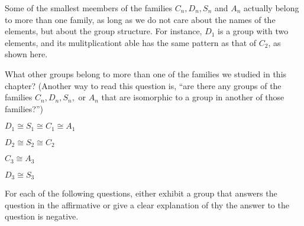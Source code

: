\begin{questions}

	\question Some of the smallest meembers of the families $C_n,D_n, S_n$ and $A_n$ actually belong to more than one family, as long as we do not care about the names of the elements, but about the group structure. For instance, $D_1$ is a group with two elements, and its mulitplicationt able has the same pattern as that of $C_2$, as shown here.
	\par What other groups belong to more than one of the families we studied in this chapter? (Another way to read this question is, ``are there any groups of the families $C_n, D_n, S_n,$ or $A_n$ that are isomorphic to a group in another of those families?'')
	
	\begin{solution}
		\par $D_1\cong S_1\cong C_1 \cong A_1$
		\par $D_2\cong S_2 \cong C_2$
		\par $C_3\cong A_3$
		\par $D_3\cong S_3$
	\end{solution}

	\question For each of the following questions, either exhibit a group that answers the question in the affirmative or give a clear explanation of thy the answer to the question is negative.
\end{questions}
